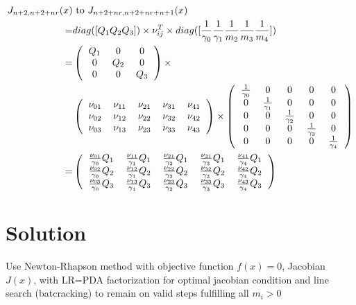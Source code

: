 \documentclass[onecolumn]{article}
\begin{document}
\begin{itemize}
\[\begin{aligned}
J_{n+2,n+2+nr}(x) & \text{ to } J_{n+2+nr,n+2+nr+n+1}(x) \\
= & diag([Q_1 Q_2 Q_3])\times \nu_{ij}^T \times
diag([\frac{1}{\gamma_0} \frac{1}{\gamma_1} \frac{1}{m_2}
\frac{1}{m_3} \frac{1}{m_4}]) \\
= & \left(
\begin{tabular}{ccc}
$Q_1$ & 0 & 0\\
0 & $Q_2$ & 0\\
0 & 0 & $Q_3$\\
\end{tabular}
\right) \times  \\
& \left(
\begin{tabular}{ccccc}
$\nu_{01}$ & $\nu_{11}$ & $\nu_{21}$ & $\nu_{31}$ & $\nu_{41}$\\
$\nu_{02}$ & $\nu_{12}$ & $\nu_{22}$ & $\nu_{32}$ & $\nu_{42}$\\
$\nu_{03}$ & $\nu_{13}$ & $\nu_{23}$ & $\nu_{33}$ & $\nu_{43}$\\
\end{tabular}
\right) \times
\left(
\begin{tabular}{ccccc}
$\frac{1}{\gamma_0}$ & 0 & 0 & 0 & 0\\
0 & $\frac{1}{\gamma_1}$ & 0 & 0 & 0\\
0 & 0 & $\frac{1}{\gamma_2}$ & 0 & 0\\
0 & 0 & 0 & $\frac{1}{\gamma_3}$ & 0\\
0 & 0 & 0 & 0 & $\frac{1}{\gamma_4}$\\
\end{tabular}
\right)\\
= & \left(
\begin{tabular}{ccccc}
$\frac{\nu_{01}}{\gamma_0}Q_1$ & $\frac{\nu_{11}}{\gamma_1}Q_1$ &
$\frac{\nu_{21}}{\gamma_2}Q_1$ & $\frac{\nu_{31}}{\gamma_3}Q_1$ &
$\frac{\nu_{41}}{\gamma_4}Q_1$\\
$\frac{\nu_{02}}{\gamma_0}Q_2$ & $\frac{\nu_{12}}{\gamma_1}Q_2$ &
$\frac{\nu_{22}}{\gamma_2}Q_2$ & $\frac{\nu_{32}}{\gamma_3}Q_2$ &
$\frac{\nu_{42}}{\gamma_4}Q_2$\\
$\frac{\nu_{03}}{\gamma_0}Q_3$ & $\frac{\nu_{13}}{\gamma_1}Q_3$ &
$\frac{\nu_{23}}{\gamma_2}Q_3$ & $\frac{\nu_{33}}{\gamma_3}Q_3$ &
$\frac{\nu_{43}}{\gamma_4}Q_3$\\
\end{tabular}
\right)
\end{aligned}
\]
\end{itemize}
\section{Solution}
Use Newton-Rhapson method with objective function $f(x)=0$, Jacobian $J(x)$,
with LR=PDA factorization for optimal jacobian condition and line search
(batcracking) to remain on valid steps fulfilling all $m_i>0$
\end{document}
